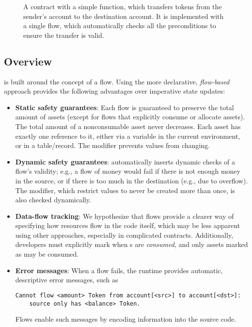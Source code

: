 \documentclass[nonacm, dvipsnames, sigconf]{acmart}
\begin{document}
\begin{figure}
    \centering
    
    \caption{A \langName contract with a simple  function, which transfers  tokens from the sender's account to the destination account.
It is implemented with a single flow, which automatically checks all the preconditions to ensure the transfer is valid.}
    \label{fig:erc20-transfer-flow}
\end{figure}

\subsection{Overview}

\langName is built around the concept of a flow.
Using the more declarative, \emph{flow-based} approach provides the following advantages over imperative state updates:
\begin{itemize}
    \item \textbf{Static safety guarantees}: Each flow is guaranteed to preserve the total amount of assets (except for flows that explicitly consume or allocate assets). %
        The total amount of a nonconsumable asset never decreases.
        Each asset has exactly one reference to it, either via a variable in the current environment, or in a table/record.
        The  modifier prevents values from changing.
    \item \textbf{Dynamic safety guarantees}: \langName automatically inserts dynamic checks of a flow's validity; e.g., a flow of money would fail if there is not enough money in the source, or if there is too much in the destination (e.g., due to overflow).
        The  modifier, which restrict values to never be created more than once, is also checked dynamically.
    \item \textbf{Data-flow tracking}: We hypothesize that flows provide a clearer way of specifying how resources flow in the code itself, which may be less apparent using other approaches, especially in complicated contracts.
        Additionally, developers must explicitly mark when \assetTxt{}s are \emph{consumed}, and only assets marked as  may be consumed.
    \item \textbf{Error messages}: When a flow fails, the \langName runtime provides automatic, descriptive error messages, such as
\begin{lstlisting}[numbers=none, basicstyle=\small\ttfamily, xleftmargin=-5.0ex]
Cannot flow <amount> Token from account[<src>] to account[<dst>]:
    source only has <balance> Token.
\end{lstlisting}
        Flows enable such messages by encoding information into the source code.
\end{itemize}
\end{document}
